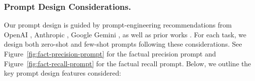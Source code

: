 \documentclass{article}
\begin{document}
\subsubsection{Prompt Design Considerations.}\label{appendix:llm-judge-prompt}

Our prompt design is guided by prompt-engineering recommendations from OpenAI \cite{openai_prompt_engineering_guide}, Anthropic \cite{anthropic_prompt_engineering_overview}, Google Gemini \cite{google_prompt_engineering_overview}, as well as prior works \cite{dammu-etal-2024-uncultured, Jung_Juneja_Mitra_2025, githubtoxicity2022, park-etal-2024-valuescope, 10.5555/3600270.3602070, yang2025escaping, zheng-etal-2024-helpful}. For each task, we design both zero-shot and few-shot prompts following these considerations. See Figure~\ref{fig:fact-precision-prompt} for the factual precision prompt and Figure~\ref{fig:fact-recall-prompt} for the factual recall prompt. Below, we outline the key prompt design features considered:
\end{document}

